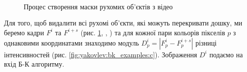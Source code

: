 \begin{figure}[H]
	\centering
	\\
	\\
	\\	
	\caption{Процес створення маски рухомих об'єктів з відео \cite{yakovlev_discrete_math_video}
		\label{fig:yakovlev:bk_examples}
	}
  \end{figure}

Для того, щоб видалити всі рухомі об'єкти, які можуть перекривати дошку, ми
беремо кадри \(F^{i}\) та \(F^{i + s}\) (рис. \ref{fig:yakovlev:bk_examples},
,
) та для
кожної пари кольорів пікселів \(p\) з однаковими координатами знаходимо
модуль \(D_{p}^{i} = \left| F_{p}^{i} - F_{p}^{i + s} \right|\) різниці
інтенсивностей (рис. \ref{fig:yakovlev:bk_examples:c}). Зображення \(D^{i}\) подаємо на вхід
Б-К алгоритму.

